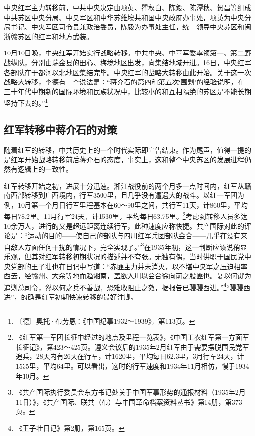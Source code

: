 中央红军主力转移前，中共中央决定由项英、瞿秋白、陈毅、陈潭秋、贺昌等组成中共苏区中央分局、中央军区和中华苏维埃共和国中央政府办事处，项英为中央分局书记、中央军区司令员兼政治委员，陈毅为办事处主任，统一领导中央苏区和闽浙赣苏区的红军和地方武装。


10月10日晚，中央红军开始实行战略转移。中共中央、中革军委率领第一、第二野战纵队，分别由瑞金县的田心、梅境地区出发，向集结地域开进。16日，中央红军各部队在于都河以北地区集结完毕。中央红军的战略大转移由此开始。关于这一次战略大转移，李德有一个说法是：“蒋介石的第四和第五次‘围剿’的经验说明，在三十年代中期新的国际环境和民族状况中，比较小的和互相隔绝的苏区是不能长期坚持下去的。”\footnote{〔德〕奥托·布劳恩：《中国纪事1932～1939》，第113页。}

\subsection{红军转移中蒋介石的对策}


随着红军的转移，中共历史上的一个时代实际即宣告结束。作为尾声，值得一提的是红军开始战略转移前后蒋介石的态度，事实上，这和整个中央苏区的发展进程仍然有逻辑上的一致性。


红军转移开始之初，进展十分迅速。湘江战役前的两个月多一点时间内，红军从赣南西部转移到广西境内，行军3500里，且几乎没有遭遇大的战斗。以红一军团为例，10月第一个月日行军里程基本在60～90里之间，共行军11天，计860里，平均每日78.2里。11月行军24天，计1530里，平均每日63.75里。\footnote{《红军第一军团长征中经过的地点及里程一览表》，《中国工农红军第一方面军长征记》，第423～425页。遵义会议后的1935年2月红军由于需要摆脱国民党军追兵，28天内有26天在行军，计1620里，平均每日62.3里，3月行军24天，计1535里，平均64里。可以看出，这时的行军速度和1934年11月相仿，慢于1934年10月。}考虑到转移人员多达10余万人，进行的又是超远距离连续行军，此种速度应称快捷。共产国际对此的评论是：“运动的目的——使自己的部队与四川红军兵团部队会合——几乎在没有来自敌人方面任何干扰的情况下，完全实现了。”\footnote{《共产国际执行委员会东方书记处关于中国军事形势的通报材料（1935年2月11日）》，《共产国际、联共（布）与中国革命档案资料丛书》第14册，第373页。}在1935年初，这一判断应该说稍显乐观，但其对红军转移初期状况的描述并不夸张。无独有偶，当时供职于国民党中央党部的王子壮也在日记中写道：“赤匪主力并未消灭，以不堪中央军之压迫相率西去，经赣州、大余等地而趋湘南，盖欲入川以会合徐向前之股匪也。复以何键为追剿总司令，然以何之兵不善战，恐难收阻止之效，据报告已骎骎西进。”\footnote{《王子壮日记》第2册，第165页。}“骎骎西进”，的确是红军初期快速转移的最好注脚。


